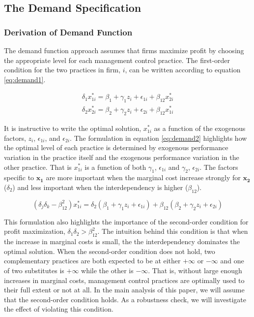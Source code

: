 \documentclass[12pt]{article}
\begin{document}
\subsection{The Demand Specification}\label{the-demand-specification}

\subsubsection{Derivation of Demand
Function}\label{derivation-of-demand-function}

The demand function approach assumes that firms maximize profit by
choosing the appropriate level for each management control practice. The
first-order condition for the two practices in firm, \(i\), can be
written according to equation \eqref{eq:demand1}.

\begin{align}\label{eq:demand1}
\delta_1 x^*_{1i} = \beta_1 + \gamma_1 z_i + \epsilon_{1i} + \beta_{12} x^*_{2i}
\\
\delta_2 x^*_{2i} = \beta_2 + \gamma_2 z_i + \epsilon_{2i} + \beta_{12} x^*_{1i}
\nonumber
\end{align}

It is instructive to write the optimal solution, \(x^*_{1i}\) as a
function of the exogenous factors, \(z_i\), \(\epsilon_{1i}\), and
\(\epsilon_{2i}\). The formulation in equation \eqref{eq:demand2}
highlights how the optimal level of each practice is determined by
exogenous performance variation in the practice itself and the exogenous
performance variation in the other practice. That is \(x^*_{1i}\) is a
function of both \(\gamma_1\), \(\epsilon_{1i}\) and \(\gamma_2\),
\(\epsilon_{2i}\). The factors specific to \(\mathbf{x_1}\) are more
important when the marginal cost increase strongly for \(\mathbf{x_2}\)
(\(\delta_2\)) and less important when the interdependency is higher
(\(\beta_{12}\)).

\begin{equation}\label{eq:demand2}
(\delta_j \delta_k - \beta_{12}^2) x^*_{1i}
    =  \delta_2 (\beta_1 + \gamma_1 z_i + \epsilon_{1i}) +
       \beta_{12} (\beta_2 + \gamma_2 z_i + \epsilon_{2i})
\end{equation}

This formulation also highlights the importance of the second-order
condition for profit maximization, \(\delta_1 \delta_2 > \beta_{12}^2\).
The intuition behind this condition is that when the increase in
marginal costs is small, the the interdependency dominates the optimal
solution. When the second-order condition does not hold, two
complementary practices are both expected to be at either \(+\infty\) or
\(-\infty\) and one of two substitutes is \(+\infty\) while the other is
\(-\infty\). That is, without large enough increases in marginal costs,
management control practices are optimally used to their full extent or
not at all. In the main analysis of this paper, we will assume that the
second-order condition holds. As a robustness check, we will investigate
the effect of violating this condition.
\end{document}

